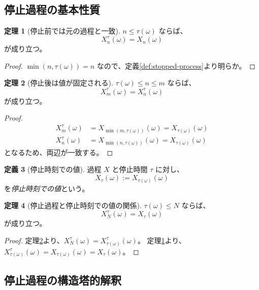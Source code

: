 \documentclass[11pt,a4paper,ja=standard]{ltjsarticle}
\theoremstyle{definition}
\newtheorem{definition}{定義}[section]
\newtheorem{theorem}[definition]{定理}
\begin{document}
\subsection{停止過程の基本性質}

\begin{theorem}[停止前では元の過程と一致]\label{thm:stopped-eq-before}
$n \le \tau(\omega)$ ならば、
\[
X^\tau_n(\omega) = X_n(\omega)
\]
が成り立つ。
\end{theorem}

\begin{proof}
$\min(n, \tau(\omega)) = n$ なので、定義\ref{def:stopped-process}より明らか。
\end{proof}

\begin{theorem}[停止後は値が固定される]\label{thm:stopped-const-after}
$\tau(\omega) \le n \le m$ ならば、
\[
X^\tau_m(\omega) = X^\tau_n(\omega)
\]
が成り立つ。
\end{theorem}

\begin{proof}
\begin{align*}
X^\tau_m(\omega) &= X_{\min(m, \tau(\omega))}(\omega) = X_{\tau(\omega)}(\omega) \\
X^\tau_n(\omega) &= X_{\min(n, \tau(\omega))}(\omega) = X_{\tau(\omega)}(\omega)
\end{align*}
となるため、両辺が一致する。
\end{proof}

\begin{definition}[停止時刻での値]\label{def:at-stopping-time}
過程 $X$ と停止時間 $\tau$ に対し、
\[
X_\tau(\omega) := X_{\tau(\omega)}(\omega)
\]
を\emph{停止時刻での値}という。
\end{definition}

\begin{theorem}[停止過程と停止時刻での値の関係]\label{thm:stopped-eq-at-stopping}
$\tau(\omega) \le N$ ならば、
\[
X^\tau_N(\omega) = X_\tau(\omega)
\]
が成り立つ。
\end{theorem}

\begin{proof}
定理\ref{thm:stopped-const-after}より、$X^\tau_N(\omega) = X^\tau_{\tau(\omega)}(\omega)$。
定理\ref{thm:stopped-eq-before}より、$X^\tau_{\tau(\omega)}(\omega) = X_{\tau(\omega)}(\omega) = X_\tau(\omega)$。
\end{proof}

\subsection{停止過程の構造塔的解釈}
\end{document}
